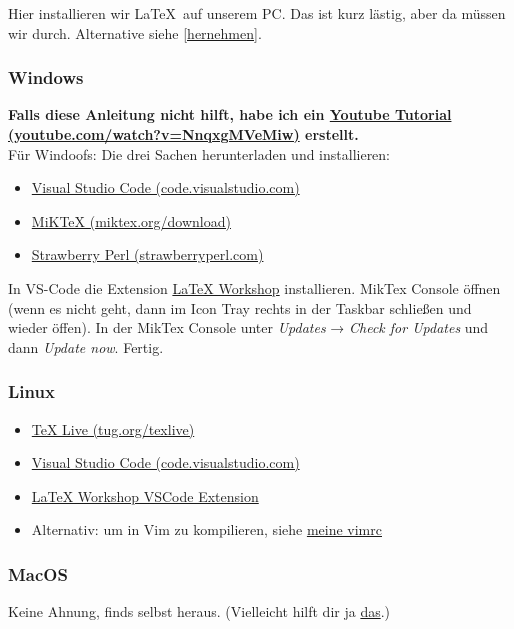 \documentclass[titlepage]{article}
\begin{document}
Hier installieren wir \LaTeX\ auf unserem PC. 
Das ist kurz lästig, aber da müssen wir durch. Alternative siehe \autoref{hernehmen}.

\subsubsection{Windows}

\textbf{Falls diese Anleitung nicht hilft, habe ich ein \href{https://www.youtube.com/watch?v=NnqxgMVeMiw}{Youtube Tutorial (youtube.com/watch?v=NnqxgMVeMiw)} erstellt.}\\

Für Windoofs: Die drei Sachen herunterladen und installieren: 
\begin{itemize}
    \item \href{https://code.visualstudio.com/}{Visual Studio Code (code.visualstudio.com)}
    \item \href{https://miktex.org/download}{MiKTeX (miktex.org/download)}
    \item \href{https://strawberryperl.com/}{Strawberry Perl (strawberryperl.com)}
\end{itemize}
In VS-Code die Extension \href{https://open-vsx.org/extension/James-Yu/latex-workshop}{LaTeX Workshop} installieren. MikTex Console öffnen (wenn es nicht geht, dann im Icon Tray rechts in der Taskbar schließen und wieder öffen).
In der MikTex Console unter \textit{Updates} → \textit{Check for Updates} und dann \textit{Update now}. Fertig. 
\subsubsection{Linux}
\begin{itemize}
    \item \href{https://tug.org/texlive}{TeX Live (tug.org/texlive)}
    \item \href{https://code.visualstudio.com/}{Visual Studio Code (code.visualstudio.com)}
    \item \href{https://open-vsx.org/extension/James-Yu/latex-workshop}{LaTeX Workshop VSCode Extension}
    \item Alternativ: um in Vim zu kompilieren, siehe \href{https://gitlab.com/sagerer/hyprreis/-/blob/main/.vimrc}{meine vimrc}
\end{itemize}

\subsubsection{MacOS}
Keine Ahnung, finds selbst heraus.
(Vielleicht hilft dir ja \href{https://tex.stackexchange.com/questions/220/i-want-to-start-using-latex-on-mac-os-x-where-do-i-start}{das}.)
\end{document}
